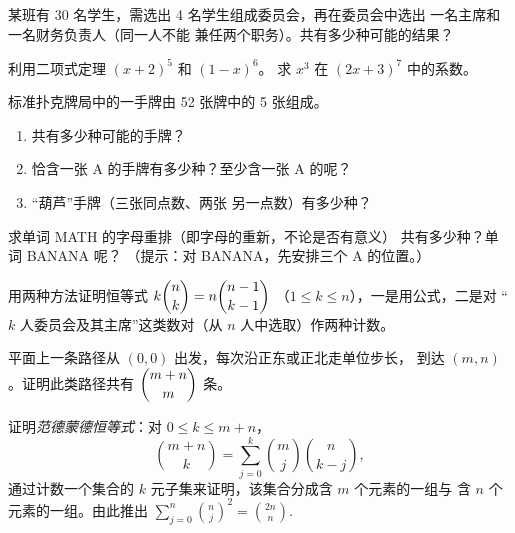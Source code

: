 \begin{exercise}[$\star$]\label{exo:g12:comb:3}
某班有 30 名学生，需选出 4 名学生组成委员会，再在委员会中选出
一名主席和一名财务负责人（同一人不能
兼任两个职务）。共有多少种可能的结果？
\end{exercise}

\begin{exercise}[$\star$]\label{exo:g12:comb:4}
利用二项式定理 $(x + 2)^5$ 和 $(1 - x)^6$。
求 $x^3$ 在 $(2x + 3)^7$ 中的系数。
\end{exercise}

\begin{exercise}[$\star\star$]\label{exo:g12:comb:5}
标准扑克牌局中的一手牌由 52 张牌中的 5 张组成。
\begin{enumerate}
  \item 共有多少种可能的手牌？
  \item 恰含一张 A 的手牌有多少种？至少含一张 A 的呢？
  \item “葫芦”手牌（三张同点数、两张
        另一点数）有多少种？
\end{enumerate}
\end{exercise}

\begin{exercise}[$\star\star$]\label{exo:g12:comb:6}
求单词 MATH 的字母重排（即字母的重新，不论是否有意义）
共有多少种？单词 BANANA 呢？
（提示：对 BANANA，先安排三个 A 的位置。）
\end{exercise}

\begin{exercise}[$\star\star$]\label{exo:g12:comb:7}
用两种方法证明恒等式 $k\dbinom{n}{k} = n\dbinom{n-1}{k-1}$
（$1 \leq k \leq n$），一是用公式，二是对
“$k$ 人委员会及其主席”这类数对（从 $n$ 人中选取）作两种计数。
\end{exercise}

\begin{exercise}[$\star\star$]\label{exo:g12:comb:8}
平面上一条路径从 $(0,0)$ 出发，每次沿正东或正北走单位步长，
到达 $(m, n)$。证明此类路径共有 $\dbinom{m+n}{m}$ 条。
\end{exercise}

\begin{exercise}[$\star\star\star$]\label{exo:g12:comb:9}
证明\emph{范德蒙德恒等式}：对 $0 \leq k \leq m + n$，
\[
\binom{m+n}{k} = \sum_{j=0}^{k} \binom{m}{j}\binom{n}{k-j},
\]
通过计数一个集合的 $k$ 元子集来证明，该集合分成含 $m$ 个元素的一组与
含 $n$ 个元素的一组。由此推出
$\displaystyle\sum_{j=0}^{n}\binom{n}{j}^{\!2} = \binom{2n}{n}$.
\end{exercise}

